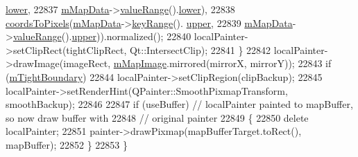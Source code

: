 \begin{DoxyCode}
      \hyperlink{class_q_c_p_range_aa3aca3edb14f7ca0c85d912647b91745}{lower},
22837                               \hyperlink{class_q_c_p_color_map_a8709272aa8f0be3ca111bf3866806f8b}{mMapData}->\hyperlink{class_q_c_p_color_map_data_a025be4d7ba0494fd7b38a5a56c737f2a}{valueRange}().\hyperlink{class_q_c_p_range_aa3aca3edb14f7ca0c85d912647b91745}{lower}),
22838                \hyperlink{class_q_c_p_abstract_plottable_ade710a776104b14c1c835168ce1bfc5c}{coordsToPixels}(\hyperlink{class_q_c_p_color_map_a8709272aa8f0be3ca111bf3866806f8b}{mMapData}->\hyperlink{class_q_c_p_color_map_data_a4765180639742460f64ab6c97c745c08}{keyRange}().
      \hyperlink{class_q_c_p_range_ae44eb3aafe1d0e2ed34b499b6d2e074f}{upper},
22839                               \hyperlink{class_q_c_p_color_map_a8709272aa8f0be3ca111bf3866806f8b}{mMapData}->\hyperlink{class_q_c_p_color_map_data_a025be4d7ba0494fd7b38a5a56c737f2a}{valueRange}().\hyperlink{class_q_c_p_range_ae44eb3aafe1d0e2ed34b499b6d2e074f}{upper})).normalized();
22840     localPainter->setClipRect(tightClipRect, Qt::IntersectClip);
22841   \}
22842   localPainter->drawImage(imageRect, \hyperlink{class_q_c_p_color_map_a66110813b42eca78b64095b2a1f285a0}{mMapImage}.mirrored(mirrorX, mirrorY));
22843   \textcolor{keywordflow}{if} (\hyperlink{class_q_c_p_color_map_ac2e9425fe4381b496726e1c09f978302}{mTightBoundary})
22844     localPainter->setClipRegion(clipBackup);
22845   localPainter->setRenderHint(QPainter::SmoothPixmapTransform, smoothBackup);
22846 
22847   \textcolor{keywordflow}{if} (useBuffer) \textcolor{comment}{// localPainter painted to mapBuffer, so now draw buffer with}
22848                  \textcolor{comment}{// original painter}
22849   \{
22850     \textcolor{keyword}{delete} localPainter;
22851     painter->drawPixmap(mapBufferTarget.toRect(), mapBuffer);
22852   \}
22853 \}
\end{DoxyCode}


